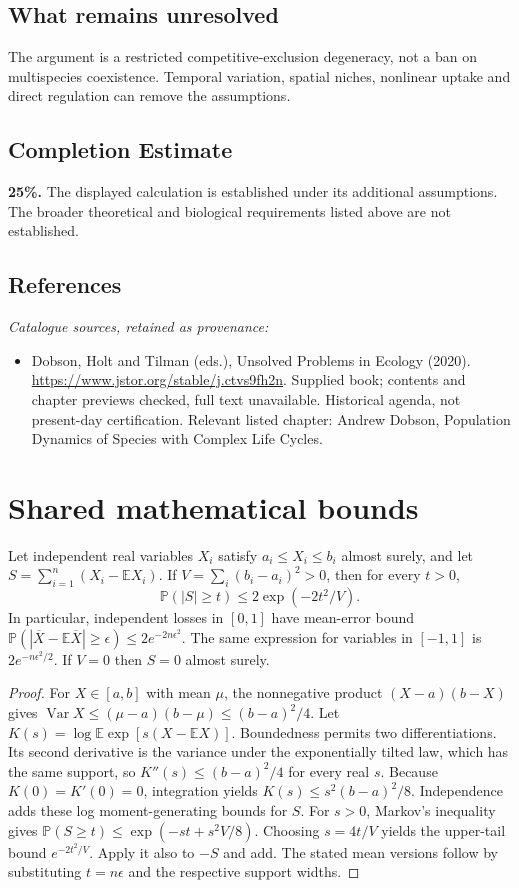 \documentclass[11pt]{article}
\begin{document}
\subsection{What remains unresolved}
The argument is a restricted competitive-exclusion degeneracy, not a ban on multispecies coexistence. Temporal variation, spatial niches, nonlinear uptake and direct regulation can remove the assumptions.
\subsection{Completion Estimate}
\textbf{25\%.} The displayed calculation is established under its additional assumptions. The broader theoretical and biological requirements listed above are not established.
\subsection{References}
\noindent\emph{Catalogue sources, retained as provenance:}
\begin{itemize}
\item Dobson, Holt and Tilman (eds.), Unsolved Problems in Ecology (2020). \url{https://www.jstor.org/stable/j.ctvs9fh2n}. Supplied book; contents and chapter previews checked, full text unavailable. Historical agenda, not present-day certification. Relevant listed chapter: Andrew Dobson, Population Dynamics of Species with Complex Life Cycles.
\end{itemize}




\section{Shared mathematical bounds}\label{app:bounds}
\begin{lemma}\label{lem:bounded}
Let independent real variables $X_i$ satisfy $a_i\leq X_i\leq b_i$ almost surely,
and let $S=\sum_{i=1}^n(X_i-\mathbb{E} X_i)$. If
$V=\sum_i(b_i-a_i)^2>0$, then for every $t>0$,
\[
 \mathbb{P}(|S|\geq t)\leq 2\exp(-2t^2/V).
\]
In particular, independent losses in $[0,1]$ have mean-error bound
$\mathbb{P}(|\overline X-\mathbb{E}\overline X|\geq\epsilon)
\leq2e^{-2n\epsilon^2}$. The same expression for variables in $[-1,1]$
is $2e^{-n\epsilon^2/2}$. If $V=0$ then $S=0$ almost surely.
\end{lemma}
\begin{proof}
For $X\in[a,b]$ with mean $\mu$, the nonnegative product
$(X-a)(b-X)$ gives
$\operatorname{Var} X\leq(\mu-a)(b-\mu)\leq(b-a)^2/4$.
Let $K(s)=\log\mathbb{E}\exp[s(X-\mathbb{E} X)]$.
Boundedness permits two differentiations. Its second derivative is the variance
under the exponentially tilted law, which has the same support, so
$K''(s)\leq(b-a)^2/4$ for every real $s$.
Because $K(0)=K'(0)=0$, integration yields
$K(s)\leq s^2(b-a)^2/8$.
Independence adds these log moment-generating bounds for $S$.
For $s>0$, Markov's inequality gives
$\mathbb{P}(S\geq t)\leq\exp(-st+s^2V/8)$.
Choosing $s=4t/V$ yields the upper-tail bound $e^{-2t^2/V}$.
Apply it also to $-S$ and add. The stated mean versions follow by substituting
$t=n\epsilon$ and the respective support widths.
\end{proof}
\end{document}
